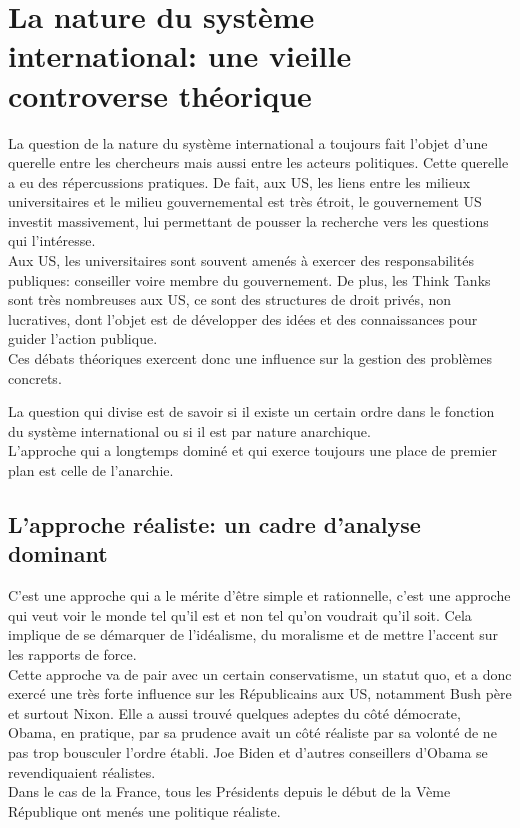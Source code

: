 \documentclass[10pt, a4paper, openany]{book}
\begin{document}
\chapter{La nature du système international: une vieille controverse théorique}

La question de la nature du système international a toujours fait l'objet d'une querelle entre les chercheurs mais aussi entre les acteurs politiques. Cette querelle a eu des répercussions pratiques. De fait, aux US, les liens entre les milieux universitaires et le milieu gouvernemental est très étroit, le gouvernement US investit massivement, lui permettant de pousser la recherche vers les questions qui l'intéresse. \\
Aux US, les universitaires sont souvent amenés à exercer des responsabilités publiques: conseiller voire membre du gouvernement. De plus, les Think Tanks sont très nombreuses aux US, ce sont des structures de droit privés, non lucratives, dont l'objet est de développer des idées et des connaissances pour guider l'action publique. \\
Ces débats théoriques exercent donc une influence sur la gestion des problèmes concrets. 


La question qui divise est de savoir si il existe un certain ordre dans le fonction du système international ou si il est par nature anarchique. \\
L'approche qui a longtemps dominé et qui exerce toujours une place de premier plan est celle de l'anarchie. 

\section{L'approche réaliste: un cadre d'analyse dominant}

C'est une approche qui a le mérite d'être simple et rationnelle, c'est une approche qui veut voir le monde tel qu'il est et non tel qu'on voudrait qu'il soit. Cela implique de se démarquer de l'idéalisme, du moralisme et de mettre l'accent sur les rapports de force. \\
Cette approche va de pair avec un certain conservatisme, un statut quo, et a donc exercé une très forte influence sur les Républicains aux US, notamment Bush père et surtout Nixon. Elle a aussi trouvé quelques adeptes du côté démocrate, Obama, en pratique, par sa prudence avait un côté réaliste par sa volonté de ne pas trop bousculer l'ordre établi. Joe Biden et d'autres conseillers d'Obama se revendiquaient réalistes. \\
Dans le cas de la France, tous les Présidents depuis le début de la Vème République ont menés une politique réaliste.
\end{document}
